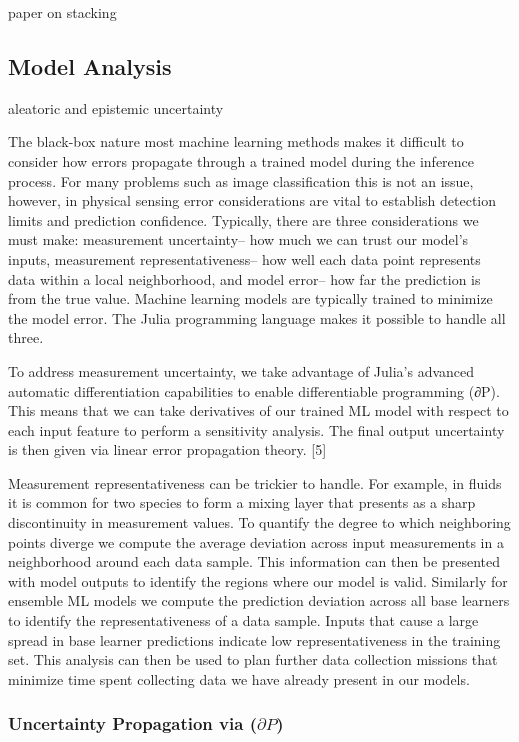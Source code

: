 paper on stacking \cite{ModelStacking}

\subsection{Model Analysis}
aleatoric and epistemic uncertainty

The black-box nature most machine learning methods makes it difficult to consider how errors propagate through a trained model during the inference process. For many problems such as image classification this is not an issue, however, in physical sensing error considerations are vital to establish detection limits and prediction confidence. Typically, there are three considerations we must make: measurement uncertainty– how much we can trust our model’s inputs, measurement representativeness– how well each data point represents data within a local neighborhood, and model error– how far the prediction is from the true value. Machine learning models are typically trained to minimize the model error. The Julia programming language makes it possible to handle all three. 


To address measurement uncertainty, we take advantage of Julia’s advanced automatic differentiation capabilities to enable differentiable programming (∂P). This means that we can take derivatives of our trained ML model with respect to each input feature to perform a sensitivity analysis. The final output uncertainty is then given via linear error propagation theory. [5]

Measurement representativeness can be trickier to handle. For example, in fluids it is common for two species to form a mixing layer that presents as a sharp discontinuity in measurement values. To quantify the degree to which neighboring points diverge we compute the average deviation across input measurements in a neighborhood around each data sample. This information can then be presented with model outputs to identify the regions where our model is valid. Similarly for ensemble ML models we compute the prediction deviation across all base learners to identify the representativeness of a data sample. Inputs that cause a large spread in base learner predictions indicate low representativeness in the training set. This analysis can then be used to plan further data collection missions that minimize time spent collecting data we have already present in our models. 

\subsubsection{Uncertainty Propagation via ($\partial P$)}

